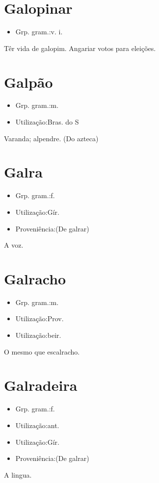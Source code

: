 \section{Galopinar}
\begin{itemize}
\item {Grp. gram.:v. i.}
\end{itemize}
Têr vida de galopim.
Angariar votos para eleições.
\section{Galpão}
\begin{itemize}
\item {Grp. gram.:m.}
\end{itemize}
\begin{itemize}
\item {Utilização:Bras. do S}
\end{itemize}
Varanda; alpendre.
(Do azteca)
\section{Galra}
\begin{itemize}
\item {Grp. gram.:f.}
\end{itemize}
\begin{itemize}
\item {Utilização:Gír.}
\end{itemize}
\begin{itemize}
\item {Proveniência:(De \textunderscore galrar\textunderscore )}
\end{itemize}
A voz.
\section{Galracho}
\begin{itemize}
\item {Grp. gram.:m.}
\end{itemize}
\begin{itemize}
\item {Utilização:Prov.}
\end{itemize}
\begin{itemize}
\item {Utilização:beir.}
\end{itemize}
O mesmo que \textunderscore escalracho\textunderscore .
\section{Galradeira}
\begin{itemize}
\item {Grp. gram.:f.}
\end{itemize}
\begin{itemize}
\item {Utilização:ant.}
\end{itemize}
\begin{itemize}
\item {Utilização:Gír.}
\end{itemize}
\begin{itemize}
\item {Proveniência:(De \textunderscore galrar\textunderscore )}
\end{itemize}
A lingua.
